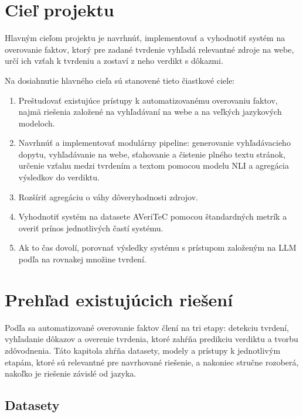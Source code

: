 \documentclass[a4paper,11pt]{article}
\begin{document}
\section{Cieľ projektu}

Hlavným cieľom projektu je navrhnúť, implementovať a vyhodnotiť systém na
overovanie faktov, ktorý pre zadané tvrdenie vyhľadá relevantné zdroje na
webe, určí ich vzťah k tvrdeniu a zostaví z neho verdikt s dôkazmi.

Na dosiahnutie hlavného cieľa sú stanovené tieto čiastkové ciele:
\begin{enumerate}
  \item Preštudovať existujúce prístupy k automatizovanému overovaniu
        faktov, najmä riešenia založené na vyhľadávaní na webe a na
        veľkých jazykových modeloch.
  \item Navrhnúť a implementovať modulárny pipeline: generovanie
        vyhľadávacieho dopytu, vyhľadávanie na webe, sťahovanie a čistenie
        plného textu stránok, určenie vzťahu medzi tvrdením a textom
        pomocou modelu NLI a agregácia výsledkov do verdiktu.
  \item Rozšíriť agregáciu o váhy dôveryhodnosti zdrojov.
  \item Vyhodnotiť systém na datasete AVeriTeC pomocou štandardných metrík
        a overiť prínos jednotlivých častí systému.
  \item Ak to čas dovolí, porovnať výsledky systému s prístupom
        založeným na LLM podľa \cite{nath-agent} na rovnakej množine
        tvrdení.
\end{enumerate}

\section{Prehľad existujúcich riešení}

Podľa \cite{guo2022survey} sa automatizované overovanie faktov člení na
tri etapy: detekciu tvrdení, vyhľadanie dôkazov a overenie tvrdenia, ktoré
zahŕňa predikciu verdiktu a tvorbu zdôvodnenia. Táto kapitola zhŕňa
datasety, modely a prístupy k jednotlivým etapám, ktoré sú relevantné pre
navrhované riešenie, a nakoniec stručne rozoberá, nakoľko je riešenie
závislé od jazyka.

\subsection{Datasety}
\end{document}
